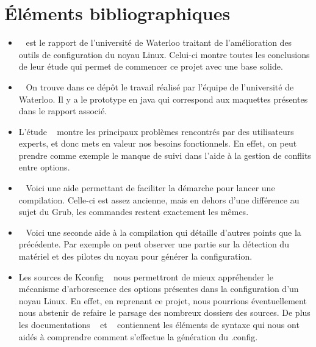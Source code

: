 \documentclass[16pts]{report}
\begin{document}

\nocite{*}

\section{Éléments bibliographiques}
\begin{itemize}
    \item  ~\cite{Waterloo:Etude} est le rapport de l’université de Waterloo
        traitant de l’amélioration des outils de configuration du noyau Linux.
        Celui-ci montre toutes les conclusions de leur étude qui permet de
        commencer ce projet avec une base solide.
    \item  ~\cite{Waterloo:Github} On trouve dans ce dépôt le travail réalisé
        par l’équipe de l’université de Waterloo. Il y a le prototype en java
        qui correspond aux maquettes présentes dans le rapport associé.
    \item L'étude ~\cite{Hubaux:2012:USC:2110147.2110164} montre les principaux
        problèmes rencontrés par des utilisateurs experts, et donc mets en
        valeur nos besoins fonctionnels. En effet, on peut prendre comme exemple
        le manque de suivi dans l'aide à la gestion de conflits entre options.
    \item  ~\cite{Existant:Kernel:tuto} Voici une aide permettant de faciliter
        la démarche pour lancer une compilation. Celle-ci est assez ancienne,
        mais en dehors d’une différence au sujet du Grub, les commandes
        restent exactement les mêmes.
    \item  ~\cite{Existant:Kernel:outils} Voici une seconde aide à la
        compilation qui détaille d’autres points que la précédente.
        Par exemple on peut observer une partie sur la détection du matériel et
        des pilotes du noyau pour générer la configuration.
    \item Les sources de Kconfig ~\cite{Existant:Kconfig:frontends} nous
        permettront de mieux appréhender le mécanisme d'arborescence des options
        présentes dans la configuration d'un noyau Linux. En effet, en reprenant
        ce projet, nous pourrions éventuellement nous abstenir de refaire le
        parsage des nombreux dossiers des sources. De plus les documentations
        ~\cite{Existant:Kconfig:vueDensemble} et ~\cite{Existant:Kconfig:langage}
        contiennent les éléments de syntaxe qui nous ont aidés à comprendre
        comment s'effectue la génération du .config.
\end{itemize}



\end{document}
